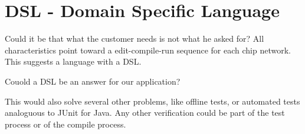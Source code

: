 \section{DSL - Domain Specific Language}
Could it be that what the customer needs is not what he asked for?
All characteristics point toward a edit-compile-run sequence for each chip network.
This suggests a language with a DSL.

Couold a DSL be an answer for our application?

This would also solve several other problems, like offline tests, or automated tests analoguous
to JUnit for Java. Any other verification could be part of the test process or of the compile process.

